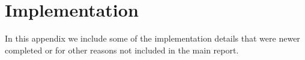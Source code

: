 \chapter{Implementation}

In this appendix we include some of the implementation details that were newer
completed or for other reasons not included in the main report.



